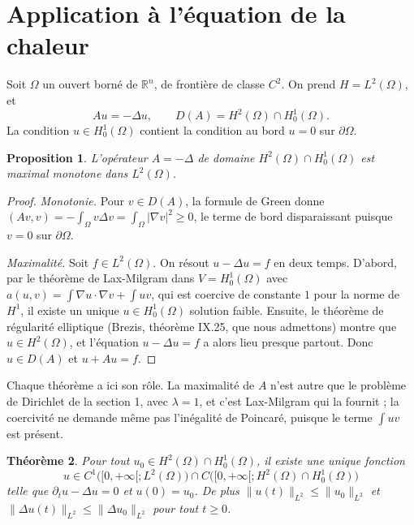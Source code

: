 \documentclass[11pt,a4paper]{article}
\theoremstyle{plain}
\newtheorem{theoreme}{Théorème}[section]
\newtheorem{proposition}[theoreme]{Proposition}
\theoremstyle{definition}
\theoremstyle{remark}
\newcommand{\R}{\mathbb{R}}
\begin{document}
\section{Application à l'équation de la chaleur}

Soit $\Omega$ un ouvert borné de $\R^n$, de frontière de classe $C^2$. On prend $H=L^2(\Omega)$, et
\[
  Au=-\Delta u,\qquad D(A)=H^2(\Omega)\cap H^1_0(\Omega) .
\]
La condition $u\in H^1_0(\Omega)$ contient la condition au bord $u=0$ sur $\partial\Omega$.

\begin{proposition}\label{prop:laplacien}
L'opérateur $A=-\Delta$ de domaine $H^2(\Omega)\cap H^1_0(\Omega)$ est maximal monotone dans $L^2(\Omega)$.
\end{proposition}

\begin{proof}
\emph{Monotonie.} Pour $v\in D(A)$, la formule de Green donne $(Av,v)=-\int_\Omega v\Delta v=\int_\Omega|\nabla v|^2\geq0$, le terme de bord disparaissant puisque $v=0$ sur $\partial\Omega$.

\emph{Maximalité.} Soit $f\in L^2(\Omega)$. On résout $u-\Delta u=f$ en deux temps. D'abord, par le théorème de Lax-Milgram dans $V=H^1_0(\Omega)$ avec $a(u,v)=\int\nabla u\cdot\nabla v+\int uv$, qui est coercive de constante $1$ pour la norme de $H^1$, il existe un unique $u\in H^1_0(\Omega)$ solution faible. Ensuite, le théorème de régularité elliptique (Brezis, théorème IX.25, que nous admettons) montre que $u\in H^2(\Omega)$, et l'équation $u-\Delta u=f$ a alors lieu presque partout. Donc $u\in D(A)$ et $u+Au=f$.
\end{proof}

Chaque théorème a ici son rôle. La maximalité de $A$ n'est autre que le problème de Dirichlet de la section 1, avec $\lambda=1$, et c'est Lax-Milgram qui la fournit ; la coercivité ne demande même pas l'inégalité de Poincaré, puisque le terme $\int uv$ est présent.

\begin{theoreme}\label{thm:chaleur}
Pour tout $u_0\in H^2(\Omega)\cap H^1_0(\Omega)$, il existe une unique fonction
\[
  u\in C^1\big([0,+\infty[;L^2(\Omega)\big)\cap C\big([0,+\infty[;H^2(\Omega)\cap H^1_0(\Omega)\big)
\]
telle que $\partial_tu-\Delta u=0$ et $u(0)=u_0$. De plus $\|u(t)\|_{L^2}\leq\|u_0\|_{L^2}$ et $\|\Delta u(t)\|_{L^2}\leq\|\Delta u_0\|_{L^2}$ pour tout $t\geq0$.
\end{theoreme}
\end{document}
